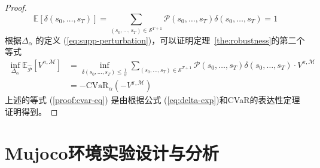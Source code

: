 \begin{proof}
\begin{equation}
    \mathbb{E}\left[\delta(s_0,\ldots,s_T)\right] = \sum_{(s_0,\ldots,s_T)\in\mathcal{S}^{T+1}}\mathcal{P}(s_0,\ldots,s_T)\delta(s_0,\ldots,s_T) = 1
\end{equation}
根据$\Delta_\alpha$ 的定义 (\ref{eq:supp-perturbation})，可以证明定理~\ref{the:robustness}的第二个等式
\begin{align}
    \inf\limits_{\Delta_\alpha}\mathbb{E}_{\hat{\mathcal{P}}}[V^{\pi,\mathcal{M}}] &= \inf\limits_{\delta(s_0,\ldots,s_T)\leq\frac{1}{\alpha}}\sum_{(s_0,\ldots,s_T)\in\mathcal{S}^{T+1}}\mathcal{P}(s_0,\ldots,s_T)\delta(s_0,\ldots,s_T)\cdot V^{\pi,\mathcal{M}}\\
    &=-\mathrm{CVaR}_\alpha(-V^{\pi,\mathcal{M}})\label{proof:cvar-eq}
\end{align}
上述的等式 (\ref{proof:cvar-eq}) 是由根据公式 (\ref{eq:delta-exp})和CVaR的表达性定理证明得到。

\end{proof}

\section{Mujoco环境实验设计与分析}

